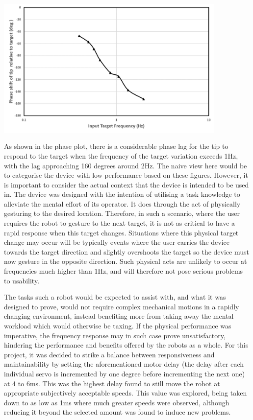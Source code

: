 \documentclass[11pt]{article}
\begin{document}
\begin{center}
\includegraphics[width=0.85\textwidth]{images/phaseResponse2.png}
\label{figure:phaseResponse}
\end{center}

As shown in the phase plot, there is a considerable phase lag for the tip to respond to the target when the frequency of the target variation exceeds 1Hz, with the lag approaching 160 degrees around 2Hz. The naive view here would be to categorise the device with low performance based on these figures. However, it is important to consider the actual context that the device is intended to be used in. The device was designed with the intention of utilising a task knowledge to alleviate the mental effort of its operator. It does through the act of physically gesturing to the desired location. Therefore, in such a scenario, where the user requires the robot to gesture to the next target, it is not as critical to have a rapid response when this target changes. Situations where this physical target change may occur will be typically events where the user carries the device towards the target direction and slightly overshoots the target so the device must now gesture in the opposite direction. Such physical acts are unlikely to occur at frequencies much higher than 1Hz, and will therefore not pose serious problems to usability. 

The tasks such a robot would be expected to assist with, and what it was designed to prove, would not require complex mechanical motions in a rapidly changing environment, instead benefiting more from taking away the mental workload which would otherwise be taxing. If the physical performance was imperative, the frequency response may in such case prove unsatisfactory, hindering the performance and benefits offered by the robots as a whole. For this project, it was decided to strike a balance between responsiveness and maintainability by setting the aforementioned motor delay (the delay after each individual servo is incremented by one degree before incrementing the next one) at 4 to 6ms. This was the highest delay found to still move the robot at appropriate subjectively acceptable speeds. This value was explored, being taken down to as low as 1ms where much greater speeds were observed, although reducing it beyond the selected amount was found to induce new problems. 
\end{document}
